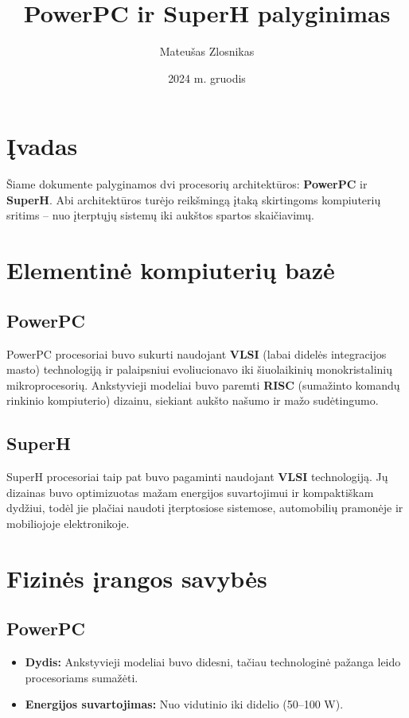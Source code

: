 \documentclass{article}
\title{PowerPC ir SuperH palyginimas}
\author{Mateušas Zlosnikas}
\date{2024 m. gruodis}
\begin{document}
\maketitle

\tableofcontents %

\section{Įvadas}
Šiame dokumente palyginamos dvi procesorių architektūros: \textbf{PowerPC} ir \textbf{SuperH}. Abi architektūros turėjo reikšmingą įtaką skirtingoms kompiuterių sritims – nuo įterptųjų sistemų iki aukštos spartos skaičiavimų.

\section{Elementinė kompiuterių bazė}
\subsection{PowerPC}
PowerPC procesoriai buvo sukurti naudojant \textbf{VLSI} (labai didelės integracijos masto) technologiją ir palaipsniui evoliucionavo iki šiuolaikinių monokristalinių mikroprocesorių. Ankstyvieji modeliai buvo paremti \textbf{RISC} (sumažinto komandų rinkinio kompiuterio) dizainu, siekiant aukšto našumo ir mažo sudėtingumo.

\subsection{SuperH}
SuperH procesoriai taip pat buvo pagaminti naudojant \textbf{VLSI} technologiją. Jų dizainas buvo optimizuotas mažam energijos suvartojimui ir kompaktiškam dydžiui, todėl jie plačiai naudoti įterptosiose sistemose, automobilių pramonėje ir mobiliojoje elektronikoje.

\section{Fizinės įrangos savybės}
\subsection{PowerPC}
\begin{itemize}
    \item \textbf{Dydis:} Ankstyvieji modeliai buvo didesni, tačiau technologinė pažanga leido procesoriams sumažėti.
    \item \textbf{Energijos suvartojimas:} Nuo vidutinio iki didelio (50–100 W).
\end{itemize}
\end{document}

